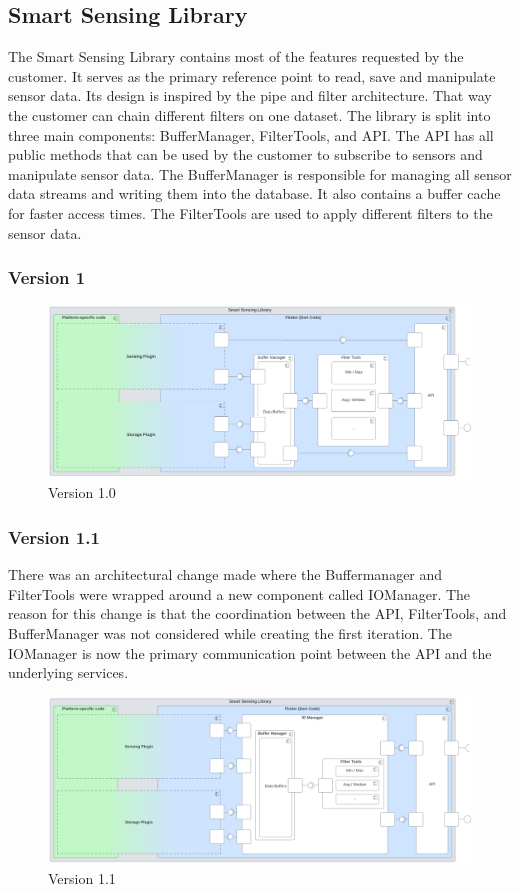 \documentclass[12pt]{article}
\begin{document}
\subsection{Smart Sensing Library}
The Smart Sensing Library contains most of the features requested by the customer. It serves as the primary reference point to read, save and manipulate sensor data. Its design is inspired by the pipe and filter architecture. That way the customer can chain different filters on one dataset. The library is split into three main components: BufferManager, FilterTools, and API. The API has all public methods that can be used by the customer to subscribe to sensors and manipulate sensor data. The BufferManager is responsible for managing all sensor data streams and writing them into the database. It also contains a buffer cache for faster access times. The FilterTools are used to apply different filters to the sensor data.

\subsubsection{Version 1}
\begin{figure}[ht]
\includegraphics[width=1\textwidth]{Graphics/SmartSensingLibraryOld.png}
\caption{\label{fig:bild1}Version 1.0}
\end{figure}
\subsubsection{Version 1.1}
There was an architectural change made where the Buffermanager and FilterTools were wrapped around a new component called IOManager.
The reason for this change is that the coordination between the API, FilterTools, and BufferManager was not considered while creating the first iteration. The IOManager is now the primary communication point between the API and the underlying services.
\begin{figure}[ht]
\includegraphics[width=1\textwidth]{Graphics/SmartSensingLibraryNew.png}
\caption{\label{fig:bild2} Version 1.1}
\end{figure}
\newpage
\end{document}

